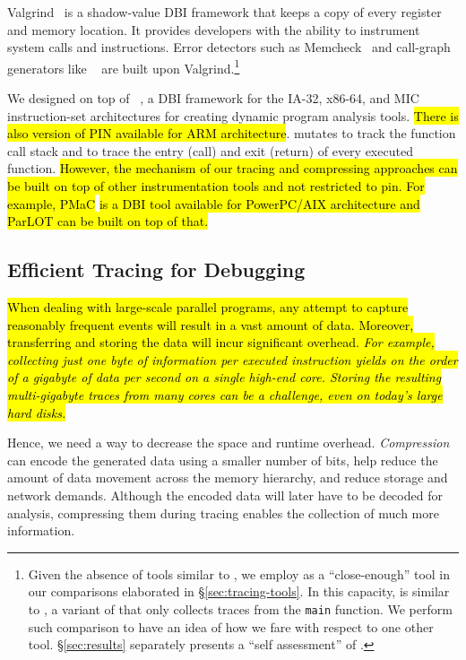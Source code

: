 Valgrind~\cite{valgrind} is a shadow-value DBI framework that keeps a copy of every register and memory location. It provides developers with the ability to instrument system calls and instructions. Error detectors such as Memcheck~\cite{memcheck} and call-graph generators like \callgrind~\cite{callgrind} are built upon Valgrind.\footnote{Given the absence of tools similar to \parlot, we employ \callgrind
 as a ``close-enough'' tool in our comparisons elaborated in \S\ref{sec:tracing-tools}.
 In this capacity, \callgrind is similar to \parlotm, a variant of \parlot that only collects
 traces from the {\tt main} function. We perform such comparison to have an idea of how we fare
 with respect to one other tool. \S\ref{sec:results} separately
 presents a ``self assessment'' of \parlot.}

 
%


We designed \parlot on top of \pin~\cite{pin}, a DBI framework for the IA-32, x86-64, and MIC instruction-set architectures for creating dynamic program analysis tools.\hl{ There is also version of PIN available for ARM architecture}\cite{pinarm}. \parlot mutates \pin to track the function call stack and to trace the entry (call) and exit (return) of every executed function. \hl{However, the mechanism of our tracing and compressing approaches can be built on top of other instrumentation tools and not restricted to pin. For example, PMaC }\cite{pmac} \hl{ is a DBI tool available for PowerPC/AIX architecture and ParLOT can be built on top of that.}


\subsection{Efficient Tracing for Debugging}
\hl{When dealing with large-scale parallel programs, any attempt to capture reasonably frequent events will result in a vast amount of data. Moreover, transferring and storing the data will incur significant overhead. \textit{For example, collecting just one byte of information per executed instruction yields on the order of a gigabyte of data per second on a single high-end core. Storing the resulting multi-gigabyte traces from many cores can be a challenge, even on today's large hard disks.} }

Hence, we need a way to decrease the space and runtime overhead. \textit{Compression} can encode the generated data using a smaller number of bits, help
reduce the amount of data movement across the memory hierarchy, and
reduce storage and network demands.
%
Although the encoded data will later have to be decoded for analysis, compressing them during tracing enables the collection of much more information.

